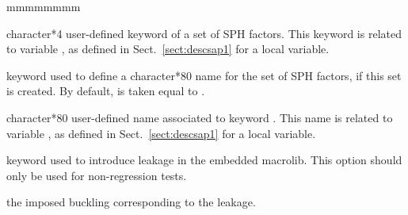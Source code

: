 \begin{ListeDeDescription}{mmmmmmmm}
\item[\dusa{TEXT4}] character*4 user-defined keyword of a set of SPH factors. This keyword is related to variable
, as defined in Sect.~\ref{sect:descsap1} for a local variable.

\item[\moc{LOCNAM}] keyword used to define a character*80 name for the set of SPH factors, if this set is created. By
default,  is taken equal to .

\item[\dusa{TEXT80}] character*80 user-defined name associated to keyword . This name is related to
variable , as defined in Sect.~\ref{sect:descsap1} for a local variable.

\item[\moc{LEAK}] keyword used to introduce leakage in the embedded {\sc macrolib}. This option should only be used for non-regression tests.

\item[\dusa{b2}] the imposed buckling corresponding to the leakage.

\end{ListeDeDescription}
\eject
